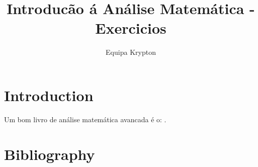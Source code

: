 \documentclass{article}
\title{Introducão á Análise Matemática - Exercicios}
\author{Equipa Krypton}
\theoremstyle{definition}
\theoremstyle{remark}
\begin{document}
\maketitle

\section{Introduction}

Um bom livro de análise matemática avancada é o:  \cite{friedman1970foundations}.


\newpage
\section*{Bibliography}
\printbibliography
\end{document}
